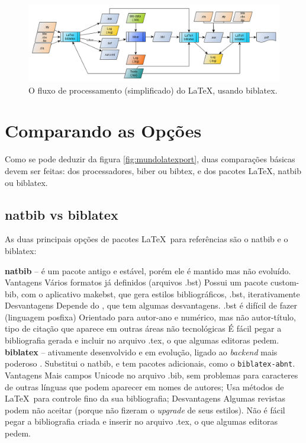 \begin{figure}[hbt]
    \centering
    \includegraphics[width=0.8\linewidth]{"Images/LaTeX processing flow"}
    \caption{O fluxo de processamento (simplificado) do \LaTeX, usando
    biblatex.}
    \label{fig:latex-processing-flow2}
\end{figure}

\section{Comparando as Opções}

Como se pode deduzir da figura \ref{fig:mundolatexport}, duas comparações básicas devem ser feitas: dos processadores, biber ou bibtex, e dos pacotes \LaTeX, natbib ou biblatex.

\subsection{natbib vs biblatex}

As duas principais opções de pacotes \LaTeX\    
para referências são o natbib e o biblatex\parencite{biber:2012}:



\begin{outline}
    \1 \textbf{natbib} -- é um pacote antigo e estável, porém ele é  mantido mas não evoluído. 
    \2 Vantagens
    \3 Vários formatos já definidos (arquivos .bst)
    \3 Possui um pacote custom-bib, com o aplicativo makebst, que gera estilos bibliográficos, .bst, iterativamente
    \2 Desvantagens
    \3 Depende do , que tem algumas desvantagens.
    \3 .bst é difícil de fazer (linguagem posfixa)
    \3 Orientado para autor-ano e numérico, mas não autor-título, tipo de citação que aparece em outras áreas não tecnológicas
    \3 É fácil pegar a bibliografia gerada e incluir no arquivo .tex, o que algumas editoras pedem.
    \1 \textbf{biblatex} -- ativamente desenvolvido e em evolução, ligado
    ao \textit{backend} mais poderoso \hologo{biber}. Substitui o natbib, e tem pacotes adicionais, como o \lstinline|biblatex-abnt|.
    \2 Vantagens
    \3 Mais campos
    \3 Unicode no arquivo .bib, sem problemas para caracteres de outras línguas que podem aparecer em nomes de autores;
    \3 Usa métodos de \LaTeX\ para controle fino da sua bibliografia;
    \2 Desvantagens
    \3 Algumas revistas podem não aceitar (porque não fizeram o
     \textit{upgrade} de seus estilos).
    \3 Não é fácil pegar a bibliografia criada e inserir no arquivo .tex, o que algumas editoras pedem.
\end{outline}


